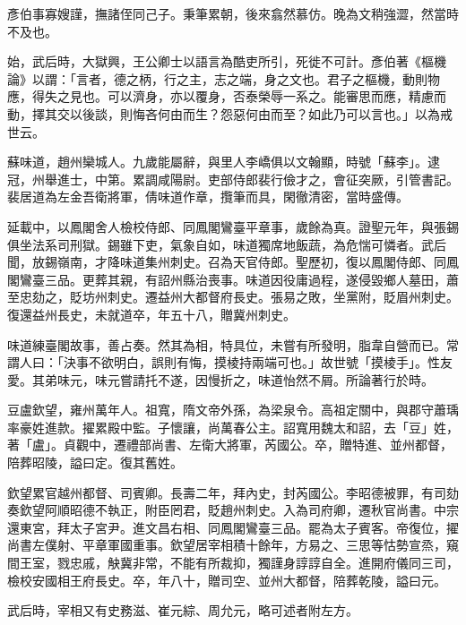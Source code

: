 \begin{pinyinscope}
 彥伯事寡嫂謹，撫諸侄同己子。秉筆累朝，後來翕然慕仿。晚為文稍強澀，然當時不及也。



 始，武后時，大獄興，王公卿士以語言為酷吏所引，死徙不可計。彥伯著《樞機論》以謂：「言者，德之柄，行之主，志之端，身之文也。君子之樞機，動則物應，得失之見也。可以濟身，亦以覆身，否泰榮辱一系之。能審思而應，精慮而動，擇其交以後談，則悔吝何由而生？怨惡何由而至？如此乃可以言也。」以為戒世云。



 蘇味道，趙州欒城人。九歲能屬辭，與里人李嶠俱以文翰顯，時號「蘇李」。逮冠，州舉進士，中第。累調咸陽尉。吏部侍郎裴行儉才之，會征突厥，引管書記。裴居道為左金吾衛將軍，倩味道作章，攬筆而具，閑徹清密，當時盛傳。



 延載中，以鳳閣舍人檢校侍郎、同鳳閣鸞臺平章事，歲餘為真。證聖元年，與張錫俱坐法系司刑獄。錫雖下吏，氣象自如，味道獨席地飯蔬，為危惴可憐者。武后聞，放錫嶺南，才降味道集州刺史。召為天官侍郎。聖歷初，復以鳳閣侍郎、同鳳閣鸞臺三品。更葬其親，有詔州縣治喪事。味道因役庸過程，遂侵毀鄉人墓田，蕭至忠劾之，貶坊州刺史。遷益州大都督府長史。張易之敗，坐黨附，貶眉州刺史。復還益州長史，未就道卒，年五十八，贈冀州刺史。



 味道練臺閣故事，善占奏。然其為相，特具位，未嘗有所發明，脂韋自營而已。常謂人曰：「決事不欲明白，誤則有悔，摸棱持兩端可也。」故世號「摸棱手」。性友愛。其弟味元，味元嘗請托不遂，因慢折之，味道怡然不屑。所論著行於時。



 豆盧欽望，雍州萬年人。祖寬，隋文帝外孫，為梁泉令。高祖定關中，與郡守蕭瑀率豪姓進款。擢累殿中監。子懷讓，尚萬春公主。詔寬用魏太和詔，去「豆」姓，著「盧」。貞觀中，遷禮部尚書、左衛大將軍，芮國公。卒，贈特進、並州都督，陪葬昭陵，謚曰定。復其舊姓。



 欽望累官越州都督、司賓卿。長壽二年，拜內史，封芮國公。李昭德被罪，有司劾奏欽望阿順昭德不執正，附臣罔君，貶趙州刺史。入為司府卿，遷秋官尚書。中宗還東宮，拜太子宮尹。進文昌右相、同鳳閣鸞臺三品。罷為太子賓客。帝復位，擢尚書左僕射、平章軍國重事。欽望居宰相積十餘年，方易之、三思等怙勢宣烝，窺間王室，戮忠戚，觖冀非常，不能有所裁抑，獨謹身諄諄自全。進開府儀同三司，檢校安國相王府長史。卒，年八十，贈司空、並州大都督，陪葬乾陵，謚曰元。



 武后時，宰相又有史務滋、崔元綜、周允元，略可述者附左方。




\end{pinyinscope}
